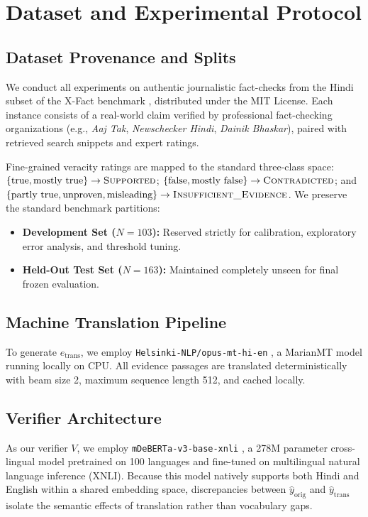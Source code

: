 \documentclass[11pt,a4paper]{article}
\begin{document}
\section{Dataset and Experimental Protocol}
\label{sec:setup}

\subsection{Dataset Provenance and Splits}
We conduct all experiments on authentic journalistic fact-checks from the Hindi subset of the X-Fact benchmark \citep{gupta-srikumar-2021-xfact}, distributed under the MIT License. Each instance consists of a real-world claim verified by professional fact-checking organizations (e.g., \emph{Aaj Tak}, \emph{Newschecker Hindi}, \emph{Dainik Bhaskar}), paired with retrieved search snippets and expert ratings.

Fine-grained veracity ratings are mapped to the standard three-class space: $\{\text{true}, \text{mostly true}\} \rightarrow \textsc{Supported}$; $\{\text{false}, \text{mostly false}\} \rightarrow \textsc{Contradicted}$; and $\{\text{partly true}, \text{unproven}, \text{misleading}\} \rightarrow \textsc{Insufficient\_Evidence}$. We preserve the standard benchmark partitions:
\begin{itemize}
    \item \textbf{Development Set ($N=103$):} Reserved strictly for calibration, exploratory error analysis, and threshold tuning.
    \item \textbf{Held-Out Test Set ($N=163$):} Maintained completely unseen for final frozen evaluation.
\end{itemize}

\subsection{Machine Translation Pipeline}
To generate $e_{\text{trans}}$, we employ \texttt{Helsinki-NLP/opus-mt-hi-en} \citep{tiedemann-thottingal-2020-opus}, a MarianMT model running locally on CPU. All evidence passages are translated deterministically with beam size 2, maximum sequence length 512, and cached locally.

\subsection{Verifier Architecture}
As our verifier $V$, we employ \texttt{mDeBERTa-v3-base-xnli} \citep{he-etal-2021-deberta}, a 278M parameter cross-lingual model pretrained on 100 languages and fine-tuned on multilingual natural language inference (XNLI). Because this model natively supports both Hindi and English within a shared embedding space, discrepancies between $\hat{y}_{\text{orig}}$ and $\hat{y}_{\text{trans}}$ isolate the semantic effects of translation rather than vocabulary gaps.
\end{document}
